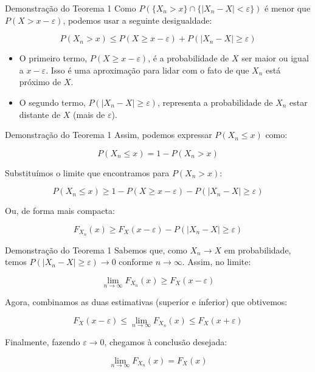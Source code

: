 \documentclass[12pt]{beamer}
\begin{document}
\begin{frame}{}
	\begin{block}{Demonstração do Teorema 1}
	Como \( P(\{X_n > x\} \cap \{|X_n - X| < \varepsilon\}) \) é menor que \( P(X > x - \varepsilon) \), podemos usar a seguinte desigualdade:
	
	\[
	P(X_n > x) \leq P(X \geq x - \varepsilon) + P(|X_n - X| \geq \varepsilon)
	\]
	
	\begin{itemize}
		\item O primeiro termo, \( P(X \geq x - \varepsilon) \), é a probabilidade de \( X \) ser maior ou igual a \( x - \varepsilon \). Isso é uma aproximação para lidar com o fato de que \( X_n \) está próximo de \( X \).\pause
		\item O segundo termo, \( P(|X_n - X| \geq \varepsilon) \), representa a probabilidade de \( X_n \) estar distante de \( X \) (mais de \( \varepsilon \)).
	\end{itemize}	
	\end{block}
\end{frame}

\begin{frame}{}
	\begin{block}{Demonstração do Teorema 1}
	Assim, podemos expressar \( P(X_n \leq x) \) como:
	
	\[
	P(X_n \leq x) = 1 - P(X_n > x)
	\]
	
	Substituímos o limite que encontramos para \( P(X_n > x) \):
	
	\[
	P(X_n \leq x) \geq 1 - P(X \geq x - \varepsilon) - P(|X_n - X| \geq \varepsilon)
	\]
	
	Ou, de forma mais compacta:
	
	\[
	F_{X_n}(x) \geq F_X(x - \varepsilon) - P(|X_n - X| \geq \varepsilon)
	\]	
	\end{block}
\end{frame}

\begin{frame}{}
	\begin{block}{Demonstração do Teorema 1}
	Sabemos que, como \( X_n \to X \) em probabilidade, temos \( P(|X_n - X| \geq \varepsilon) \to 0 \) conforme \( n \to \infty \). Assim, no limite:
	
	\[
	\lim_{n \to \infty} F_{X_n}(x) \geq F_X(x - \varepsilon)
	\]
	
	
	Agora, combinamos as duas estimativas (superior e inferior) que obtivemos:
	
	\[
	F_X(x - \varepsilon) \leq \lim_{n \to \infty} F_{X_n}(x) \leq F_X(x + \varepsilon)
	\]
	
	Finalmente, fazendo \( \varepsilon \to 0 \), chegamos à conclusão desejada:
	
	\[
	\lim_{n \to \infty} F_{X_n}(x) = F_X(x)
	\]	
	\end{block}
\end{frame}
\end{document}
